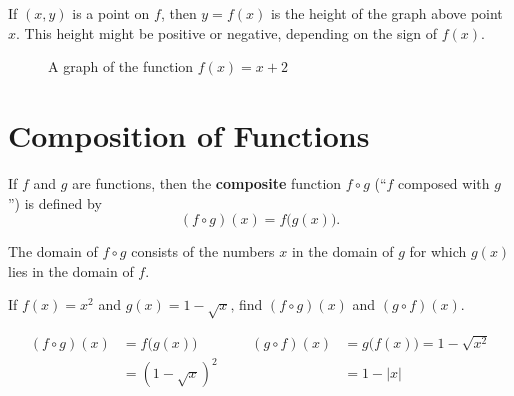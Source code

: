 If \( (x,y) \) is a point on \(f\), then \(y=f(x)\) is the height of the graph above point \(x\).
This height might be positive or negative, depending on the sign of \(f(x)\).
\begin{figure}[H]
    \begin{center}
      \caption{A graph of the function \(f(x)=x+2\)}
    \end{center}
  \end{figure}

\section{Composition of Functions}

\begin{defn}
  If \(f\) and \(g\) are functions, then the \textbf{composite} function \(f \circ g\) (``\(f\) composed with \(g\)'') is defined by
  \[ (f \circ g)(x)=f\bigl(g(x)\bigr) \text{.} \]
  \begin{remark}
    The domain of \( f \circ g \) consists of the numbers \(x\) in the domain of \(g\) for which \(g(x)\) lies in the domain of \(f\).
  \end{remark}
\end{defn}
\begin{ex}
  If
  \(f(x)=x^2\)
  and
  \(g(x)=1-\sqrt{x}\text{,}\)
  find \( (f \circ g)(x) \) and \( (g \circ f)(x)\).
  \begin{sol}
    \begin{align*}
      (f \circ g)(x)
      &=f\big(g(x)\big)
      &&&
      (g \circ f)(x)
      &=g\big(f(x)\big)=1-\sqrt{x^2}
      \\
      &=(1-\sqrt{x})^2
      &&&
      &= 1-|x|
    \end{align*}
  \end{sol}
\end{ex}
